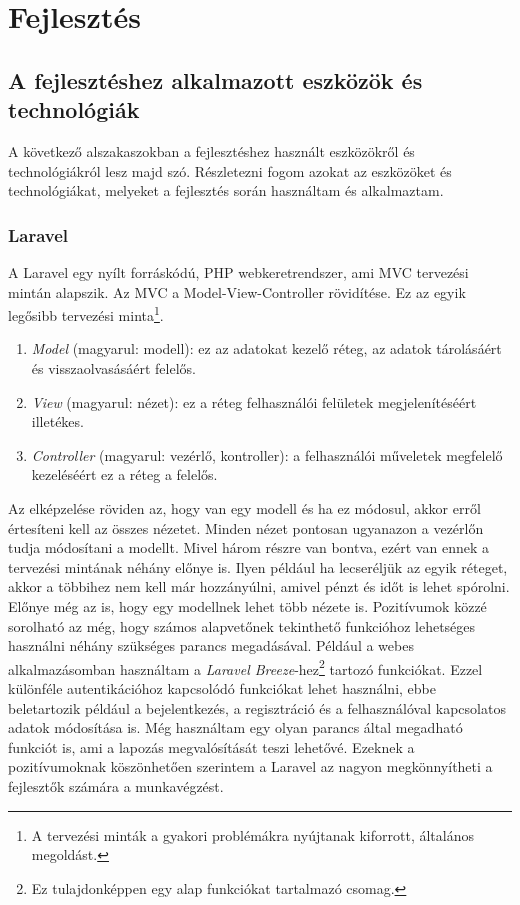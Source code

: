 \documentclass[]{thesis-ekf}
\theoremstyle{definition}
\theoremstyle{remark}
\begin{document}
	\chapter{Fejlesztés}\label{ch-fejlesztes}		
	\section{A fejlesztéshez alkalmazott eszközök és technológiák}
		A következő alszakaszokban a fejlesztéshez használt eszközökről és technológiákról lesz majd szó. Részletezni fogom azokat az eszközöket és technológiákat, melyeket a fejlesztés során használtam és alkalmaztam.
	\subsection{Laravel}\label{sc-laravel}
		A Laravel egy nyílt forráskódú, PHP webkeretrendszer, ami MVC tervezési mintán alapszik. Az MVC a Model-View-Controller rövidítése. Ez az egyik legősibb tervezési minta\footnote{A tervezési minták a gyakori problémákra nyújtanak kiforrott, általános megoldást.}.
		\begin{enumerate}
			\item \emph{Model} (magyarul: modell): ez az adatokat kezelő réteg, az adatok tárolásáért és visszaolvasásáért felelős.
			\item \emph{View} (magyarul: nézet): ez a réteg felhasználói felületek megjelenítéséért illetékes. 
			\item \emph{Controller} (magyarul: vezérlő, kontroller): a felhasználói műveletek megfelelő kezeléséért ez a réteg a felelős.
		\end{enumerate}
		Az elképzelése röviden az, hogy van egy modell és ha ez módosul, akkor erről értesíteni kell az összes nézetet. Minden nézet pontosan ugyanazon a vezérlőn tudja módosítani a modellt. Mivel három részre van bontva, ezért van ennek a tervezési mintának néhány előnye is. Ilyen például ha lecseréljük az egyik réteget, akkor a többihez nem kell már hozzányúlni, amivel pénzt és időt is lehet spórolni. Előnye még az is, hogy egy modellnek lehet több nézete is. Pozitívumok közzé sorolható az még, hogy számos alapvetőnek tekinthető funkcióhoz lehetséges használni néhány szükséges parancs megadásával. Például a webes alkalmazásomban használtam a \emph{Laravel Breeze}-hez\footnote{Ez tulajdonképpen egy alap funkciókat tartalmazó csomag.} tartozó funkciókat. Ezzel különféle autentikációhoz kapcsolódó funkciókat lehet használni, ebbe beletartozik például a bejelentkezés, a regisztráció és a felhasználóval kapcsolatos adatok módosítása is. Még használtam egy olyan parancs által megadható funkciót is, ami a lapozás megvalósítását teszi lehetővé. Ezeknek a pozitívumoknak köszönhetően szerintem a Laravel az nagyon megkönnyítheti a fejlesztők számára a munkavégzést. 
		\cite{Kusper, Laravel}
\end{document}
